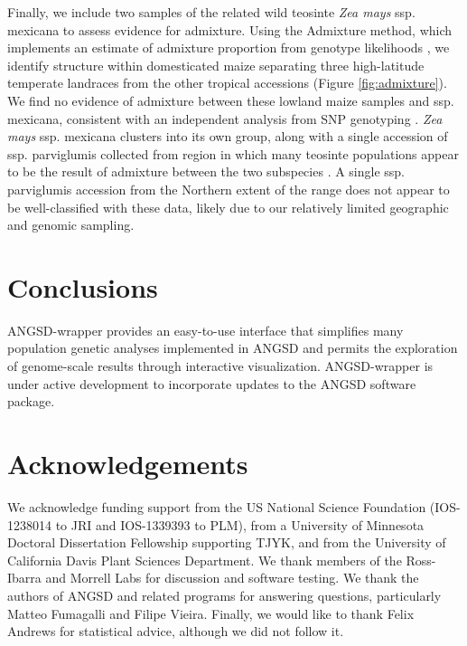 \documentclass[10pt,a4paper]{article}
\newcommand{\jri}[1]{\todo[size=\scriptsize, color=flame]{#1}}
\begin{document}
Finally, we include two samples of the related wild teosinte \textit{Zea mays} ssp. {mexicana} to assess evidence for admixture.  
Using the Admixture method, which implements an estimate of admixture proportion from genotype likelihoods \citep{pmid24026093}, we identify  structure within domesticated maize separating three high-latitude temperate landraces from the other tropical accessions (Figure \ref{fig:admixture}).\jri{parviglumis spelled wrong in figure legend}
We find no evidence of admixture between these lowland maize samples and  ssp. {mexicana}, consistent with an independent analysis from SNP genotyping \citep{hufford2013genomic}.
\textit{Zea mays} ssp. {mexicana} clusters into its own group, along with a single accession of ssp. {parviglumis} collected from region in which many teosinte populations appear to be the result of admixture between the two subspecies \citep{fang2012megabase}.  
A single  ssp. {parviglumis} accession from the Northern extent of the range does not appear to be well-classified with these data, likely due to our relatively limited geographic and genomic sampling.

\section*{Conclusions}
ANGSD-wrapper provides an easy-to-use interface that simplifies many population genetic analyses implemented in ANGSD \citep{korneliussen2014angsd} and permits the exploration of genome-scale results through interactive visualization.
ANGSD-wrapper is under active development to incorporate updates to the ANGSD software package.  

\section*{Acknowledgements}
We acknowledge funding support from the US National Science Foundation (IOS-1238014 to JRI and IOS-1339393 to PLM), from a University of Minnesota Doctoral Dissertation Fellowship supporting TJYK, and from the University of California Davis Plant Sciences Department. We thank members of the Ross-Ibarra and Morrell Labs for discussion and software testing. We thank the authors of ANGSD and related programs for answering questions, particularly Matteo Fumagalli and Filipe Vieira. Finally, we would like to thank Felix Andrews for statistical advice, although we did not follow it. 
\clearpage




\end{document}

